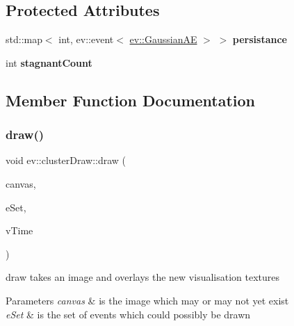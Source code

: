 \subsection*{Protected Attributes}
\begin{DoxyCompactItemize}
\item 
\mbox{\label{classev_1_1clusterDraw_ae6c0e0349720c63461e9a9124cef8e5e}} 
std\+::map$<$ int, ev\+::event$<$ \hyperlink{classev_1_1GaussianAE}{ev\+::\+Gaussian\+AE} $>$ $>$ {\bfseries persistance}
\item 
\mbox{\label{classev_1_1clusterDraw_a7e4aa3579dc604914af2a5b21e35a0e6}} 
int {\bfseries stagnant\+Count}
\end{DoxyCompactItemize}


\subsection{Member Function Documentation}
\mbox{\label{classev_1_1clusterDraw_aa70978bb98c7bde912eb03288f21cbb5}} 
\subsubsection{\texorpdfstring{draw()}{draw()}}
{\footnotesize\ttfamily void ev\+::cluster\+Draw\+::draw (\begin{DoxyParamCaption}\item[{cv\+::\+Mat \&}]{canvas,  }\item[{const ev\+::v\+Queue \&}]{e\+Set,  }\item[{int}]{v\+Time }\end{DoxyParamCaption})\hspace{0.3cm}{\ttfamily [virtual]}}



draw takes an image and overlays the new visualisation textures 


\begin{DoxyParams}{Parameters}
{\em canvas} & is the image which may or may not yet exist \\
\hline
{\em e\+Set} & is the set of events which could possibly be drawn \\
\hline
\end{DoxyParams}


